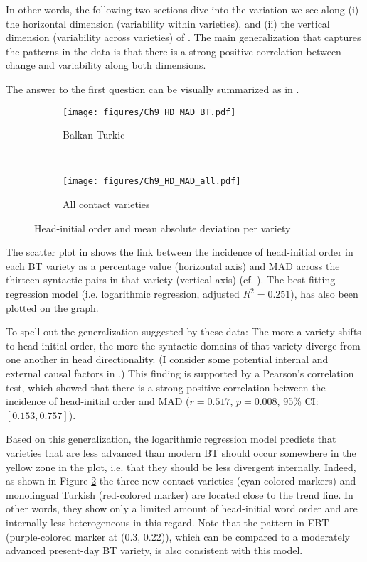\documentclass[output=paper,colorlinks,citecolor=brown]{langscibook}
\begin{document}
In other words, the following two sections dive into the variation we see along (i) the horizontal dimension (variability within varieties), and (ii) the vertical dimension (variability across varieties) of . The main generalization that captures the patterns in the data is that there is a strong positive correlation between change and variability along both dimensions.


The answer to the first question can be visually summarized as in .

\begin{figure}
\begin{subfigure}[c]{\textwidth}
  \centering
  \texttt{[image: figures/Ch9\_HD\_MAD\_BT.pdf]}
  \caption{Balkan Turkic}
  \label{fig:keskin:HD_MAD_BT}
\end{subfigure}\medskip\\
\begin{subfigure}[c]{\textwidth}
  \centering
  \texttt{[image: figures/Ch9\_HD\_MAD\_all.pdf]}
  \caption{All contact varieties}
  \label{fig:keskin:HD_MAD_all}
\end{subfigure}
  \caption{Head-initial order and mean absolute deviation per variety}
  \label{fig:keskin:HD_MAD_var}
\end{figure}

The scatter plot in  shows the link between the incidence of head-initial order in each BT variety as a percentage value (horizontal axis) and MAD across the thirteen syntactic pairs in that variety (vertical axis) (cf. ). The best fitting regression model (i.e. logarithmic regression, adjusted $R^2 = 0.251$), has also been plotted on the graph.\largerpage

To spell out the generalization suggested by these data: The more a variety shifts to head-initial order, the more the syntactic domains of that variety diverge from one another in head directionality. (I consider some potential internal and external causal factors in .) This finding is supported by a Pearson's correlation test, which showed that there is a strong positive correlation between the incidence of head-initial order and MAD ($r = 0.517$, $p = 0.008$, 95\% CI: $[0.153, 0.757]$). 

Based on this generalization, the logarithmic regression model predicts that varieties that are less advanced than modern BT should occur somewhere in the yellow zone in the plot, i.e. that they should be less divergent internally. Indeed, as shown in Figure \ref{fig:keskin:HD_MAD_all} the three new contact varieties (cyan-colored markers) and monolingual Turkish (red-colored marker) are located close to the trend line. In other words, they show only a limited amount of head-initial word order and are internally less heterogeneous in this regard. Note that the pattern in EBT (purple-colored marker at (0.3, 0.22)), which can be compared to a moderately advanced present-day BT variety, is also consistent with this model.
\end{document}
